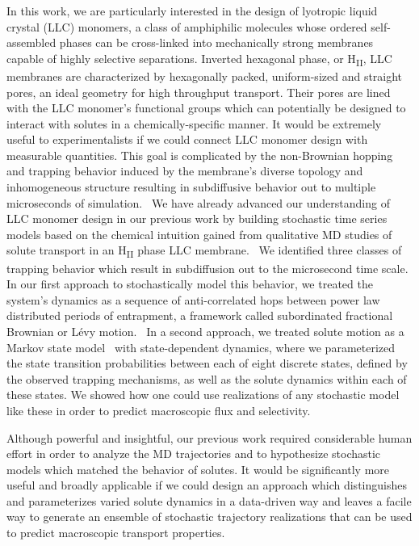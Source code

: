 \documentclass[journal=jpcbfk,manuscript=article]{achemso}
\begin{document}
  In this work, we are particularly interested in the design of lyotropic liquid 
  crystal (LLC) monomers, a class of amphiphilic molecules whose ordered self-assembled
  phases can be cross-linked into mechanically strong membranes capable of highly 
  selective separations. Inverted hexagonal phase, or H\textsubscript{II}, LLC membranes
  are characterized by hexagonally packed, uniform-sized and straight pores, an ideal
  geometry for high throughput transport. Their pores are lined with the LLC monomer's
  functional groups which can potentially be designed to interact with solutes in a 
  chemically-specific manner. It would be extremely useful to experimentalists if we 
  could connect LLC monomer design with measurable quantities. This goal is complicated
  by the non-Brownian hopping and trapping behavior induced by the membrane's diverse
  topology and inhomogeneous structure resulting in subdiffusive behavior out to 
  multiple microseconds of simulation.~\cite{coscia_understanding_2019,coscia_chemically_2019}
  We have already advanced our understanding of LLC monomer design in our previous work
  by building stochastic time series models based on the chemical intuition gained
  from qualitative MD studies of solute transport in an H\textsubscript{II} phase LLC
  membrane.~\cite{coscia_chemically_2019,coscia_capturing_2020} We identified three 
  classes of trapping behavior which result in subdiffusion out to the microsecond 
  time scale. In our first approach to stochastically model this behavior, we treated 
  the system's dynamics as a sequence of anti-correlated hops between power law distributed periods of 
  entrapment, a framework called subordinated fractional Brownian or L\'evy
  motion.~\cite{thiel_weak_2014,teuerle_modeling_2013} In a second approach, we treated 
  solute motion as a Markov state model~\cite{pande_everything_2010} with state-dependent
  dynamics, where we parameterized the state transition probabilities between each of
  eight discrete states, defined by the observed trapping mechanisms, as well as the 
  solute dynamics within each of these states. We showed how one could use realizations
  of any stochastic model like these in order to predict macroscopic flux and selectivity. 
  
  Although powerful and insightful, our previous work required considerable human effort
  in order to analyze the MD trajectories and to hypothesize stochastic models which
  matched the behavior of solutes. It would be significantly more useful and broadly 
  applicable if we could design an approach which distinguishes and parameterizes varied
  solute dynamics in a data-driven way and leaves a facile way to generate an ensemble
  of stochastic trajectory realizations that can be used to predict macroscopic transport
  properties.
  
\end{document}
